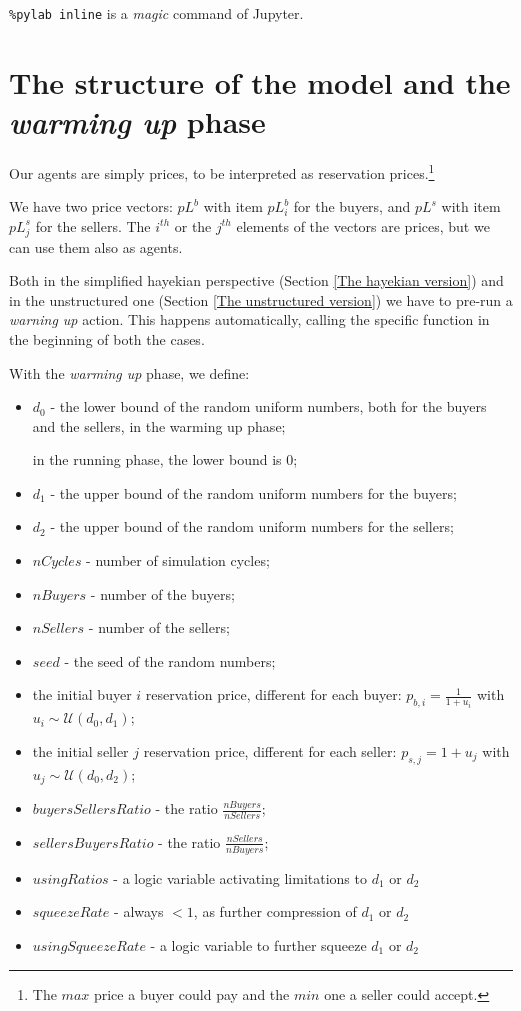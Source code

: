 \documentclass[10pt]{report}
\begin{document}
\verb|%pylab inline| 
is a \emph{magic} command of Jupyter.

\section{The structure of the model and the \emph{warming up} phase}\label{The structure of the model}

Our agents are simply prices, to be interpreted as reservation prices.\footnote{The $max$ price a buyer could pay and the $min$ one a seller could accept.}

We have two price vectors: $pL^b$ with item $pL^b_i$ for the buyers, and $pL^s$ with item $pL^s_j$ for the sellers. The $i^{th}$ or the $j^{th}$ elements of the vectors are prices, but  we can use them also as agents.

Both in the simplified hayekian perspective (Section \ref{The hayekian version}) and in the unstructured one (Section \ref{The unstructured version}) we have to pre-run a \emph{warning up} action. This happens automatically, calling the specific function in the beginning of both the cases.

With the \emph{warming up} phase, we define:\label{parameters}

\begin{itemize}
\item $d_0$ - the lower bound of the random uniform numbers, both for the buyers and the sellers, in the warming up phase; 

in the running phase, the lower bound is $0$;
\item $d_1$ - the upper bound of the random uniform numbers for the buyers;
\item $d_2$ - the upper bound of the random uniform numbers for the sellers;
\item $nCycles$ - number of simulation cycles;
\item $nBuyers$  - number of the buyers;
\item $nSellers$ - number of the sellers;
\item $seed$ - the seed of the random numbers;
\item the initial buyer $i$ reservation price, different for each buyer: $p_{b,i}=\frac{1} {1 + u_i}$ with $u_i\sim\mathcal{U}(d_0,d_1)$;
\item the initial seller $j$ reservation price, different for each seller: $p_{s,j}=1 + u_j$ with $u_j\sim\mathcal{U}(d_0,d_2)$;
\item $buyersSellersRatio$ - the ratio $\frac{nBuyers}{nSellers}$;
\item $sellersBuyersRatio$ - the ratio $\frac{nSellers}{nBuyers}$;
\item $usingRatios$ - a logic variable activating limitations to $d_1$ or $d_2$
\item $squeezeRate$ - always $< 1$, as further compression of $d_1$ or $d_2$
\item $usingSqueezeRate$ - a logic variable to further squeeze $d_1$ or $d_2$
\end{itemize}
\end{document}
